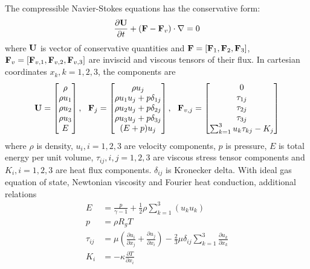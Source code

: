 \documentclass[preprint,12pt]{elsarticle}
\begin{document}
The compressible Navier-Stokes equations has the conservative form:
\begin{equation}
    \label{eq:NS}
    \frac{\partial \mathbf{U}}{\partial t} +
    (\mathbf{F} - \mathbf{F}_v) \cdot \mathbf\nabla = 0
\end{equation}
where $\mathbf{U}$ is vector of conservative quantities and
$\mathbf{F}=[\mathbf{F}_1,\mathbf{F}_2,\mathbf{F}_3]$,
$\mathbf{F}_v=[\mathbf{F}_{v,1},\mathbf{F}_{v,2},\mathbf{F}_{v,3}]$
are
inviscid and viscous tensors of
their flux.
In cartesian coordinates $x_k, k=1,2,3$, the components are
\begin{equation}
    \mathbf{U} = \begin{bmatrix}
        \rho \\ \rho u_1 \\ \rho u_2 \\ \rho u_3 \\ E
    \end{bmatrix},\ \
    \mathbf{F}_j = \begin{bmatrix}
        \rho u_j                   \\
        \rho u_1u_j + p\delta_{1j} \\
        \rho u_2u_j + p\delta_{2j} \\
        \rho u_3u_j + p\delta_{3j} \\
        (E+p)u_j                   \\
    \end{bmatrix},\ \
    \mathbf{F}_{v,j} = \begin{bmatrix}
        0                                \\
        \tau_{1j}                        \\
        \tau_{2j}                        \\
        \tau_{3j}                        \\
        \sum_{k=1}^3{u_k\tau_{kj}} - K_j \\
    \end{bmatrix}
\end{equation}
where $\rho$ is density,
$u_i, i=1,2,3$ are velocity components,
$p$ is pressure,
$E$ is total energy per unit volume,
$\tau_{ij}, i,j=1,2,3$ are viscous stress tensor components
and
$K_i, i=1,2,3$ are heat flux components.
$\delta_{ij}$ is
Kronecker delta.
With ideal gas equation of state,
Newtonian viscosity and Fourier
heat conduction, additional relations
\begin{equation}
    \begin{aligned}
        E         & = \frac{p}{\gamma -1 } + \frac{1}{2}\rho\sum_{k=1}^{3}(u_ku_k)  \\
        p         & =\rho R_g T                                                     \\
        \tau_{ij} & =
        \mu\left(\frac{\partial u_i}{\partial x_j} + \frac{\partial u_j}{\partial x_i}\right)
        -
        \frac{2}{3}\mu \delta_{ij}\sum_{k=1}^{3}{\frac{\partial u_k}{\partial x_k}} \\
        K_i       & = - \kappa \frac{\partial T}{\partial x_i}
    \end{aligned}
\end{equation}
\end{document}
